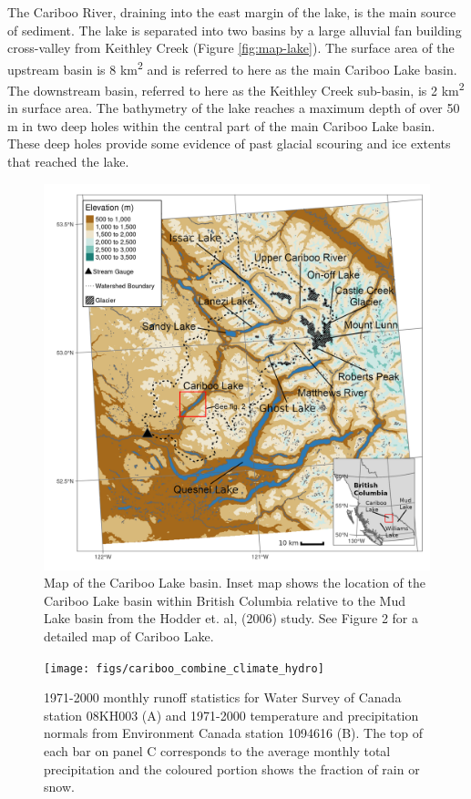 \documentclass[Royal,times,doublespace,sageh]{sagej}
\begin{document}
The Cariboo River, draining into the east margin of the lake, is the
main source of sediment. The lake is separated into two basins by a
large alluvial fan building cross-valley from Keithley Creek (Figure
\ref{fig:map-lake}). The surface area of the upstream basin is 8
km\textsuperscript{2} and is referred to here as the main Cariboo Lake
basin. The downstream basin, referred to here as the Keithley Creek
sub-basin, is 2 km\textsuperscript{2} in surface area. The bathymetry of
the lake reaches a maximum depth of over 50 m in two deep holes within
the central part of the main Cariboo Lake basin. These deep holes
provide some evidence of past glacial scouring and ice extents that
reached the lake.

\begin{figure}

{\centering \includegraphics[width=1\linewidth]{figs/cl_small_scale_inset_labels_gimp} 

}

\caption{Map of the Cariboo Lake basin. Inset map shows the location of the Cariboo Lake basin within British Columbia relative to the Mud Lake basin from the Hodder et. al, (2006) study. See Figure 2 for a detailed map of Cariboo Lake.}\label{fig:map-basin}
\end{figure}

\begin{figure}

{\centering \texttt{[image: figs/cariboo\_combine\_climate\_hydro]} 

}

\caption{1971-2000 monthly runoff statistics for Water Survey of Canada station 08KH003 (A) and 1971-2000 temperature and precipitation normals from Environment Canada station 1094616 (B). The top of each bar on panel C corresponds to the average monthly total precipitation and the coloured portion shows the fraction of rain or snow.}\label{fig:cl-hydro}
\end{figure}
\end{document}
